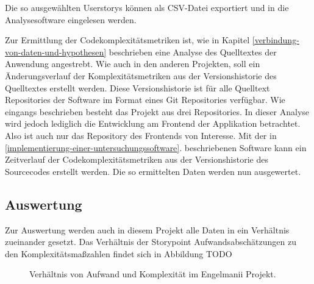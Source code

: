 Die so ausgewählten Userstorys können als \ac{CSV}-Datei exportiert und in
die Analysesoftware eingelesen werden.

Zur Ermittlung der Codekomplexitätsmetriken ist, wie in Kapitel \ref{verbindung-von-daten-und-hypothesen}
beschrieben eine Analyse des Quelltextes der Anwendung angestrebt. Wie
auch in den anderen Projekten, soll ein Änderungsverlauf der
Komplexitätsmetriken aus der Versionshistorie des Quelltextes erstellt
werden. Diese Versionshistorie ist für alle Quelltext Repositories der
Software im Format eines Git Repositories verfügbar. Wie eingangs
beschrieben besteht das Projekt aus drei Repositories. In dieser Analyse
wird jedoch lediglich die Entwicklung am Frontend der Applikation
betrachtet. Also ist auch nur das Repository des Frontends von
Interesse. Mit der in \ref{implementierung-einer-untersuchungssoftware}. beschriebenen Software kann ein Zeitverlauf
der Codekomplexitätsmetriken aus der Versionshistorie des Sourcecodes
erstellt werden. Die so ermittelten Daten werden nun ausgewertet.

\subsection{Auswertung}\label{engelmannii-Auswertung}

Zur Auswertung werden auch in diesem Projekt alle Daten in ein
Verhältnis zueinander gesetzt. Das Verhältnis der Storypoint
Aufwandsabschätzungen zu den Komplexitätsma\ss zahlen findet sich in
Abbildung TODO

\begin{figure}\label{engelmanii-graph}
  \begin{center}
      
  \end{center}
  \caption{Verhältnis von Aufwand und Komplexität im Engelmanii Projekt.}
\end{figure}

